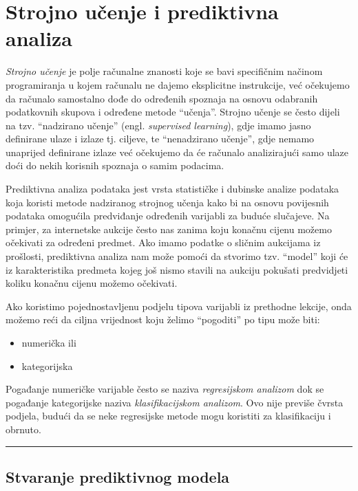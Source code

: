 \documentclass[]{book}
\providecommand{\tightlist}{%
  \setlength{\itemsep}{0pt}\setlength{\parskip}{0pt}}
\theoremstyle{definition}
\theoremstyle{definition}
\theoremstyle{definition}
\theoremstyle{remark}
\begin{document}
\section{Strojno učenje i prediktivna
analiza}\label{strojno-ucenje-i-prediktivna-analiza}

\emph{Strojno učenje} je polje računalne znanosti koje se bavi
specifičnim načinom programiranja u kojem računalu ne dajemo eksplicitne
instrukcije, već očekujemo da računalo samostalno dođe do određenih
spoznaja na osnovu odabranih podatkovnih skupova i određene metode
``učenja''. Strojno učenje se često dijeli na tzv. ``nadzirano učenje''
(engl. \emph{supervised learning}), gdje imamo jasno definirane ulaze i
izlaze tj. ciljeve, te ``nenadzirano učenje'', gdje nemamo unaprijed
definirane izlaze već očekujemo da će računalo analizirajući samo ulaze
doći do nekih korisnih spoznaja o samim podacima.

Prediktivna analiza podataka jest vrsta statističke i dubinske analize
podataka koja koristi metode nadziranog strojnog učenja kako bi na
osnovu povijesnih podataka omogućila predviđanje određenih varijabli za
buduće slučajeve. Na primjer, za internetske aukcije često nas zanima
koju konačnu cijenu možemo očekivati za određeni predmet. Ako imamo
podatke o sličnim aukcijama iz prošlosti, prediktivna analiza nam može
pomoći da stvorimo tzv. ``model'' koji će iz karakteristika predmeta
kojeg još nismo stavili na aukciju pokušati predvidjeti koliku konačnu
cijenu možemo očekivati.

Ako koristimo pojednostavljenu podjelu tipova varijabli iz prethodne
lekcije, onda možemo reći da ciljna vrijednost koju želimo ``pogoditi''
po tipu može biti:

\begin{itemize}
\tightlist
\item
  numerička ili
\item
  kategorijska
\end{itemize}

Pogađanje numeričke varijable često se naziva \emph{regresijskom
analizom} dok se pogađanje kategorijske naziva \emph{klasifikacijskom
analizom}. Ovo nije previše čvrsta podjela, budući da se neke
regresijske metode mogu koristiti za klasifikaciju i obrnuto.

\begin{center}\rule{0.5\linewidth}{\linethickness}\end{center}

\subsection{Stvaranje prediktivnog
modela}\label{stvaranje-prediktivnog-modela}
\end{document}
